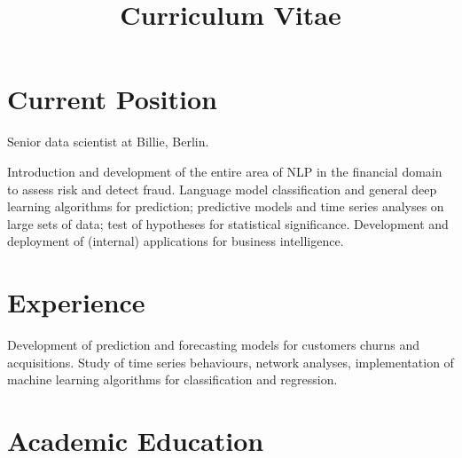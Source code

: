 \documentclass[11pt,a4paper,sans]{moderncv}
\title{Curriculum Vitae}
\begin{document}
 \makecvtitle


\section{Current Position} Senior data scientist at Billie, Berlin.

\bigskip Introduction and development of the entire area of NLP in the
financial domain to assess risk and detect fraud. Language model classification and general
deep learning algorithms for prediction; predictive models and time series
analyses on large sets of data; test of hypotheses for statistical significance.
Development and deployment of (internal) applications for business intelligence.

\section{Experience}


 {Development
of prediction and forecasting models for customers churns and acquisitions.
Study of time series behaviours, network analyses, implementation of machine
learning algorithms for classification and regression.}



\section{Academic Education}
\end{document}
